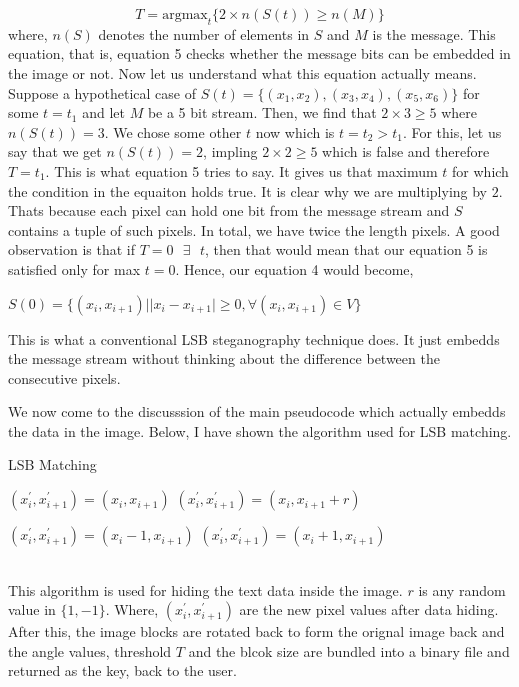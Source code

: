 \documentclass{report}
\begin{document}
\begin{equation}
T = \textrm{argmax}_{t}\{2 \times n(S(t)) \geq n(M)\}
\end{equation}
where, $n(S)$ denotes the number of elements in $S$ and $M$ is the message. This equation, that is, equation 5 checks whether the message bits can be embedded in the image or not. Now let us understand what this equation actually means. Suppose a hypothetical case of $S(t) = \{ (x_{1}, x_{2}), (x_{3}, x_{4}), (x_{5}, x_{6}) \}$ for some $t=t_{1}$ and let $M$ be a 5 bit stream. Then, we find that $2 \times 3 \geq 5$ where $n(S(t)) = 3$. We chose some other $t$ now which is $t=t_{2} > t_{1}$. For this, let us say that we get $n(S(t)) = 2$, impling $2 \times 2 \geq 5$ which is false and therefore $T=t_{1}$. This is what equation 5 tries to say. It gives us that maximum $t$ for which the condition in the equaiton holds true. It is clear why we are multiplying by $2$. Thats because each pixel can hold one bit from the message stream and $S$ contains a tuple of such pixels. In total, we have twice the length pixels.	A good observation is that if $T=0 \textrm{ }\exists \textrm{ }t$, then that would mean that our equation 5 is satisfied only for max $t=0$. Hence, our equation 4 would become,
\begin{center}
$ S(0) = \{(x_{i}, x_{i+1})| |x_{i} - x_{i+1}| \geq 0, \forall (x_{i}, x_{i+1}) \in V \} $
\end{center}
This is what a conventional LSB steganography technique does. It just embedds the message stream without thinking about the difference between the consecutive pixels. \par We now come to the discusssion of the main pseudocode which actually embedds the data in the image. Below, I have shown the algorithm used for LSB matching.
\begin{algorithm}
\caption{LSB Matching}\label{euclid}
\begin{algorithmic}[1]
	\State $(x_{i}^{'}, x_{i+1}^{'}) = (x_{i}, x_{i+1})$ 
	\Else 
	\State $(x_{i}^{'}, x_{i+1}^{'}) = (x_{i}, x_{i+1}+r)$ 
	\EndIf
\EndIf

	\State $(x_{i}^{'}, x_{i+1}^{'}) = (x_{i}-1, x_{i+1})$
	\Else
	\State $(x_{i}^{'}, x_{i+1}^{'}) = (x_{i}+1, x_{i+1})$
	\EndIf
\EndIf
\EndProcedure
\end{algorithmic}
\end{algorithm}
\\ This algorithm is used for hiding the text data inside the image. $r$ is any random value in $\{ 1, -1\}$. Where, $(x_{i}^{'}, x_{i+1}^{'})$ are the new pixel values after data hiding. After this, the image blocks are rotated back to form the orignal image back and the angle values, threshold $T$ and the blcok size are bundled into a binary file and returned as the key, back to the user. \newpage
\end{document}
